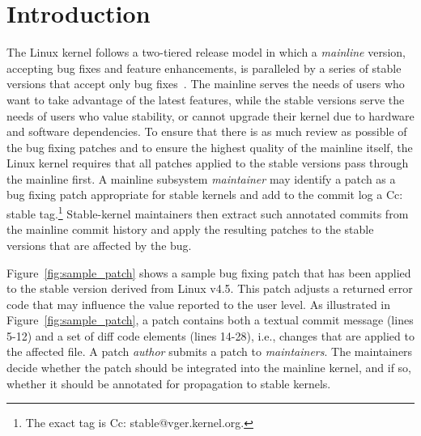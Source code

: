 \vspace{-0.25cm}
\section{Introduction}
\label{sec:intro}

The Linux kernel follows a two-tiered release model in which a \textit{mainline} version, accepting bug fixes and feature enhancements, is paralleled by a series of stable versions that accept only bug fixes~\cite{lee2003firm}. 
The mainline serves the needs of users who want to take advantage of the latest features, while the stable versions serve the needs of users who value stability, or cannot upgrade their kernel due to hardware and software dependencies. To ensure that there is as much review as possible of the bug fixing patches and to ensure the highest quality of the mainline itself, the Linux kernel
requires that all patches applied to the stable versions pass through the mainline first. A mainline subsystem \textit{maintainer} may identify a patch as a bug fixing patch
appropriate for stable kernels and add to the commit log a Cc: stable tag.\footnote{The exact tag is \textrm{Cc}: \textrm{stable@vger.kernel.org}.} Stable-kernel maintainers then extract such annotated commits from the mainline commit history and apply the resulting patches to the stable versions that are affected by the bug.

Figure~\ref{fig:sample_patch} shows a sample bug fixing patch that has been applied to
the stable version derived from Linux v4.5. This patch adjusts a returned
error code that may influence the value reported to the user level. As
illustrated in Figure~\ref{fig:sample_patch}, a patch contains both a
textual commit message (lines 5-12) and a set of diff code elements (lines
14-28), i.e., changes that are applied to the affected file. A patch
\textit{author} submits a patch to \textit{maintainers}. The
maintainers decide whether the patch should be integrated into the
mainline kernel, and if so, whether it should be annotated for propagation
to stable kernels.

